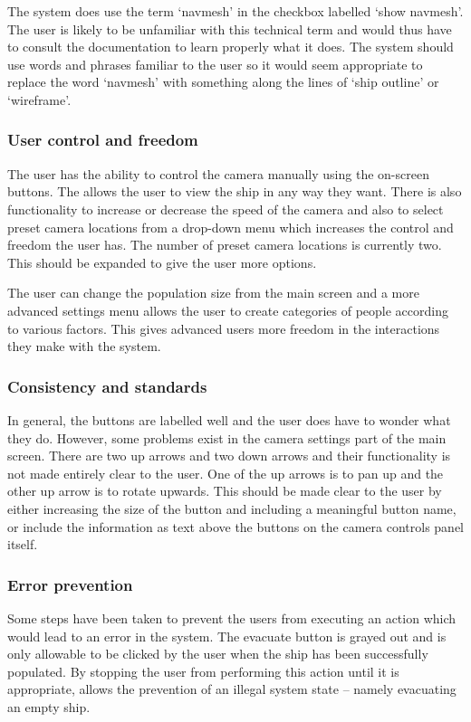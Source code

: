 The system does use the term `navmesh' in the checkbox labelled `show navmesh'. The user is likely to be unfamiliar with this technical term and would thus have to consult the documentation to learn properly what it does. The system should use words and phrases familiar to the user so it would seem appropriate to replace the word `navmesh' with something along the lines of `ship outline' or `wireframe'.

\subsubsection{User control and freedom}
The user has the ability to control the camera manually using the on-screen buttons. The allows the user to view the ship in any way they want. There is also functionality to increase or decrease the speed of the camera and also to select preset camera locations from a drop-down menu which increases the control and freedom the user has. The number of preset camera locations is currently two. This should be expanded to give the user more options.

The user can change the population size from the main screen and a more advanced settings menu allows the user to create categories of people according to various factors. This gives advanced users more freedom in the interactions they make with the system.

\subsubsection{Consistency and standards}
In general, the buttons are labelled well and the user does have to wonder what they do. However, some problems exist in the camera settings part of the main screen. There are two up arrows and two down arrows and their functionality is not made entirely clear to the user. One of the up arrows is to pan up and the other up arrow is to rotate upwards. This should be made clear to the user by either increasing the size of the button and including a meaningful button name, or include the information as text above the buttons on the camera controls panel itself.

\subsubsection{Error prevention}
Some steps have been taken to prevent the users from executing an action which would lead to an error in the system. The evacuate button is grayed out and is only allowable to be clicked by the user when the ship has been successfully populated. By stopping the user from performing this action until it is appropriate, allows the prevention of an illegal system state -- namely evacuating an empty ship.

